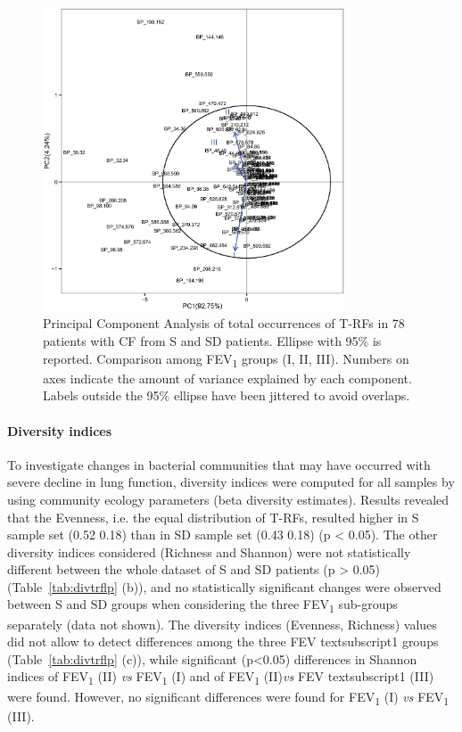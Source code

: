 \begin{figure}[!tb]
	\centering
	\includegraphics[width=0.8\textwidth]{./figures/Chapter_7/Figure_4_fev1_trf}
  	\caption{\label{fig:fig4fev1trf} Principal Component Analysis of total occurrences of T-RFs in 78 patients with CF from S and SD patients. Ellipse with 95\% is reported. Comparison among FEV\textsubscript{1} groups (I, II, III). Numbers on axes indicate the amount of variance explained by each component. Labels outside the 95\% ellipse have been jittered to avoid overlaps.}
\end{figure}

\paragraph{Diversity indices} To investigate changes in bacterial communities that may have occurred with severe decline in lung function, diversity indices were computed for all samples by using community ecology parameters (beta diversity estimates). Results revealed that the Evenness, i.e. the equal distribution of T-RFs, resulted higher in S sample set (0.52 {\textpm} 0.18) than in SD sample set (0.43 {\textpm} 0.18) (p {\textless} 0.05). The other diversity indices considered (Richness and Shannon) were not statistically different between the whole dataset of S and SD patients (p {\textgreater} 0.05) (Table~\ref{tab:divtrflp} (b)), and no statistically significant changes were observed between S and SD groups when considering the three FEV\textsubscript{1} sub-groups separately (data not shown). The diversity indices (Evenness, Richness) values did not allow to detect differences among the three FEV textsubscript{1} groups (Table~\ref{tab:divtrflp} (c)), while significant (p{\textless}0.05) differences in Shannon indices of FEV\textsubscript{1} (II) \textit{vs} FEV\textsubscript{1} (I) and of FEV\textsubscript{1} (II)\textit{vs} FEV textsubscript{1} (III) were found. However, no significant differences were found for FEV\textsubscript{1} (I) \textit{vs} FEV\textsubscript{1} (III).\\


